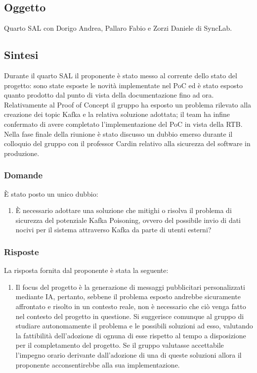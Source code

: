 \documentclass[10pt]{article}
\begin{document}
\subsection{Oggetto}
Quarto SAL con Dorigo Andrea, Pallaro Fabio e Zorzi Daniele di SyncLab.

\subsection{Sintesi}
Durante il quarto SAL il proponente è stato messo al corrente dello stato del progetto: sono state esposte le novità implementate nel PoC
ed è stato esposto quanto prodotto dal punto di vista della documentazione fino ad ora. Relativamente al Proof of Concept il gruppo ha
esposto un problema rilevato alla creazione dei topic Kafka e la relativa soluzione adottata; il team ha infine confermato di avere 
completato l'implementazione del PoC in vista della RTB.
Nella fase finale della riunione è stato discusso un dubbio emerso durante il colloquio del gruppo con il professor Cardin relativo 
alla sicurezza del software in produzione.

\subsubsection{Domande}
È stato posto un unico dubbio:
\begin{enumerate}
	\item È necessario adottare una soluzione che mitighi o risolva il problema di sicurezza del potenziale Kafka Poisoning, ovvero
	del possibile invio di dati nocivi per il sistema attraverso Kafka da parte di utenti esterni?
\end{enumerate}

\subsubsection{Risposte}
La risposta fornita dal proponente è stata la seguente:
\begin{enumerate}
	\item Il focus del progetto è la generazione di messaggi pubblicitari personalizzati mediante IA, pertanto, sebbene il problema esposto
	andrebbe sicuramente affrontato e risolto in un contesto reale, non è necessario che ciò venga fatto nel contesto del progetto in questione.
	Si suggerisce comunque al gruppo di studiare autonomamente il problema e le possibili soluzioni ad esso, valutando la fattibilità
	dell'adozione di ognuna di esse rispetto al tempo a disposizione per il completamento del progetto. Se il gruppo valutasse accettabile
	l'impegno orario derivante dall'adozione di una di queste soluzioni allora il proponente acconsentirebbe alla sua implementazione. 
\end{enumerate}
\end{document}
